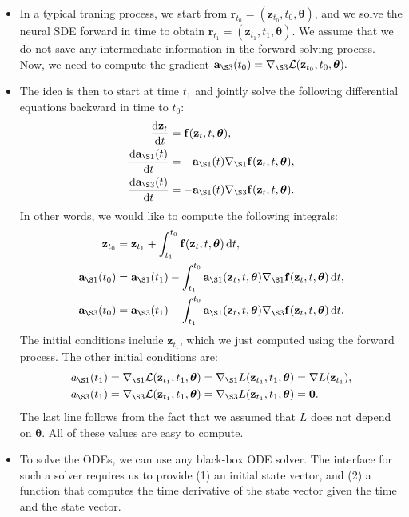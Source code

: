 \documentclass[10pt]{article}
\newcommand{\dee}{\mathrm{d}}
\newcommand{\ve}[1]{\mathbf{#1}}
\newcommand{\ves}[1]{\boldsymbol{#1}}
\newcommand{\mcal}[1]{\mathcal{#1}}
\begin{document}
\begin{itemize}
  \item In a typical traning process, we start from $\ve{r}_{t_0} = (\ve{z}_{t_0}, t_0, \ves{\theta})$, and we solve the neural SDE forward in time to obtain $\ve{r}_{t_1} = (\ve{z}_{t_1}, t_1, \ves{\theta})$. We assume that we do not save any intermediate information in the forward solving process. Now, we need to compute the gradient $\ve{a}_{\S3}(t_0) = \nabla_{\S3}\mcal{L}(\ve{z}_{t_0}, t_0, \ves{\theta}).$
  
  \item The idea is then to start at time $t_1$ and jointly solve the following differential equations backward in time to $t_0$:
  \begin{align*}
    \frac{\dee \ve{z}_t}{\dee t} &= \ve{f}(\ve{z}_t, t, \ves{\theta}), \\
    \frac{\dee \ve{a}_{\S1}(t)}{\dee t} &= -\ve{a}_{\S 1}(t) \nabla_{\S 1}\ve{f}(\ve{z}_t, t, \ves{\theta}), \\
    \frac{\dee \ve{a}_{\S3}(t)}{\dee t} &= -\ve{a}_{\S 1}(t) \nabla_{\S 3}\ve{f}(\ve{z}_t, t, \ves{\theta}).
  \end{align*}
  In other words, we would like to compute the following integrals:
  \begin{align*}
    \ve{z}_{t_0} &= \ve{z}_{t_1} + \int_{t_1}^{t_0} \ve{f}(\ve{z}_t, t, \ves{\theta})\, \dee t, \\
    \ve{a}_{\S1}(t_0) &= \ve{a}_{\S1}(t_1) - \int_{t_1}^{t_0} \ve{a}_{\S 1}(\ve{z}_t, t, \ves{\theta}) \nabla_{\S 1}\ve{f}(\ve{z}_t, t, \ves{\theta})\, \dee t, \\
    \ve{a}_{\S3}(t_0) &= \ve{a}_{\S3}(t_1) - \int_{t_1}^{t_0} \ve{a}_{\S 1}(\ve{z}_t, t, \ves{\theta}) \nabla_{\S 3}\ve{f}(\ve{z}_t, t, \ves{\theta})\, \dee t.
  \end{align*}
  The initial conditions include $\ve{z}_{t_1}$, which we just computed using the forward process. The other initial conditions are:
  \begin{align*}
    a_{\S1}(t_1) 
    &= \nabla_{\S1}\mcal{L}(\ve{z}_{t_1},t_1,\ves{\theta}) = \nabla_{\S1}L(\ve{z}_{t_1},t_1,\ves{\theta}) = \nabla L(\ve{z}_{t_1}), \\
    a_{\S3}(t_1) 
    &= \nabla_{\S3}\mcal{L}(\ve{z}_{t_1},t_1,\ves{\theta})
    = \nabla_{\S3}L(\ve{z}_{t_1},t_1,\ves{\theta}) 
    = \ve{0}.
  \end{align*} 
  The last line follows from the fact that we assumed that $L$ does not depend on $\ves{\theta}$. All of these values are easy to compute.

  \item To solve the ODEs, we can use any black-box ODE solver. The interface for such a solver requires us to provide (1) an initial state vector, and (2) a function that computes the time derivative of the state vector given the time and the state vector. 
  

\end{itemize}
\end{document}
